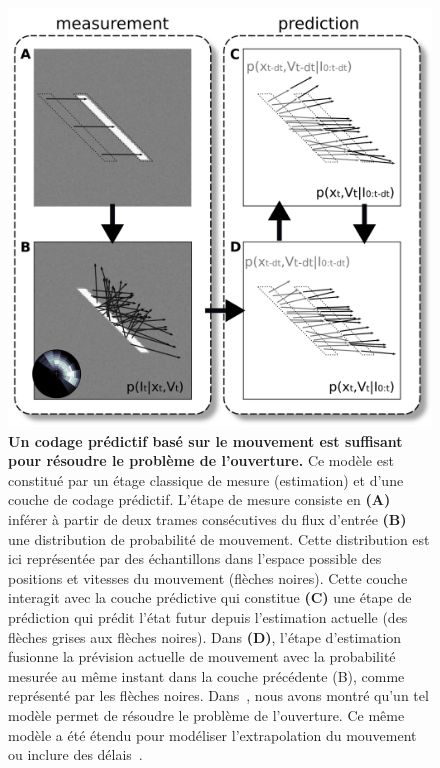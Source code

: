 \documentclass[11pt,french,a4paper,oneside]{article}%
\begin{document}
\begin{figure}%
\centerline{\includegraphics[width=\linewidth]{perrinet12pred_figure2.png}}
\caption{\textbf{Un codage prédictif basé sur le mouvement est suffisant pour résoudre le problème de l'ouverture.}
Ce modèle est constitué par un étage classique de mesure (estimation) et d'une couche de codage prédictif. L'étape de mesure consiste en \textbf {(A)} inférer à partir de deux trames consécutives du flux d'entrée \textbf {(B)} une distribution de probabilité de mouvement. Cette distribution est ici représentée par des échantillons dans l'espace possible des positions et vitesses du mouvement (flèches noires). Cette couche interagit avec la couche prédictive qui constitue \textbf {(C)} une étape de prédiction qui prédit l'état futur depuis l'estimation actuelle (des flèches grises aux flèches noires). Dans \textbf {(D)}, l'étape d'estimation fusionne la prévision actuelle de mouvement avec la probabilité mesurée au même instant dans la couche précédente (B), comme représenté par les flèches noires. %
Dans~\citep{Perrinet12pred}, nous avons montré qu'un tel modèle permet de résoudre le problème de l'ouverture. %
Ce même modèle a été étendu pour modéliser l'extrapolation du mouvement~\citep{Khoei13jpp} ou inclure des délais~\citep{KhoeiMassonPerrinet17}.
%
 }%
\label{fig:perrinet12pred}%
\end{figure}%
\end{document}
